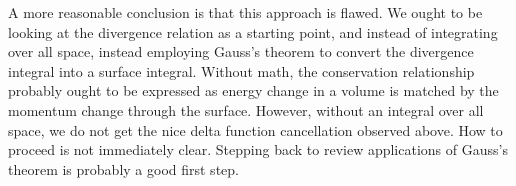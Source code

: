 A more reasonable conclusion is that this approach is flawed.  We ought to be looking at the divergence relation as a starting point, and instead of integrating over all space, instead employing Gauss's theorem to convert the divergence integral into a surface integral.  Without math, the conservation relationship probably ought to be expressed as energy change in a volume is matched by the momentum change through the surface.  However, without an integral over all space, we do not get the nice delta function cancellation observed above.  How to proceed is not immediately clear.  Stepping back to review applications of Gauss's theorem is probably a good first step.

\EndArticle
